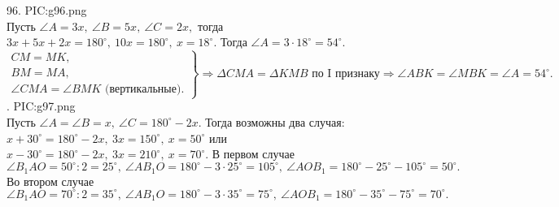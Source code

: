 96. {{PIC:g96.png}}\\
Пусть $\angle A=3x,\ \angle B=5x,\ \angle C=2x,$ тогда $3x+5x+2x=180^\circ,\ 10x=180^\circ,\ x=18^\circ.$ Тогда $\angle A=3\cdot18^\circ=54^\circ.$
$\left.\begin{array}{l}CM=MK,\\
BM=MA,\\
\angle CMA=\angle BMK\text{ (вертикальные).}\end{array}\right\}\Rightarrow \Delta CMA=\Delta KMB\text{ по I признаку}\Rightarrow \angle ABK=\angle MBK=\angle A=54^\circ.$\newpage
{}. {{PIC:g97.png}}\\
Пусть $\angle A=\angle B=x,\ \angle C=180^\circ-2x.$ Тогда возможны два случая: $x+30^\circ=180^\circ-2x,\ 3x=150^\circ,\ x=50^\circ$ или $x-30^\circ=180^\circ-2x,\
3x=210^\circ,\ x=70^\circ.$ В первом случае  $\angle B_1AO=50^\circ:2=25^\circ,\ \angle AB_1O=180^\circ-3\cdot25^\circ=105^\circ,\ \angle AOB_1=180^\circ-25^\circ-105^\circ=50^\circ.$ Во втором случае  $\angle B_1AO=70^\circ:2=35^\circ,\ \angle AB_1O=180^\circ-3\cdot35^\circ=75^\circ,\ \angle AOB_1=180^\circ-35^\circ-75^\circ=70^\circ.$\\
